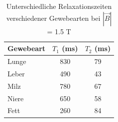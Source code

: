 \begin{table}
	\centering
		\begin{tabular}{|l|c|c|}
			\hline
			Gewebeart & $T_1$ (ms) & $T_2$ (ms) \\
			\hline
			Lunge & 830 & 79 \\
			Leber & 490 & 43 \\
			Milz & 780 & 67 \\
			Niere & 650 & 58 \\
			Fett & 260 & 84 \\	
			\hline	
		\end{tabular}
		\caption{Unterschiedliche Relaxationszeiten verschiedener
			Gewebearten bei $|\vec{B}|$ = 1.5 T}
		\label{mri:quant:tab:zeiten}
\end{table}
%









